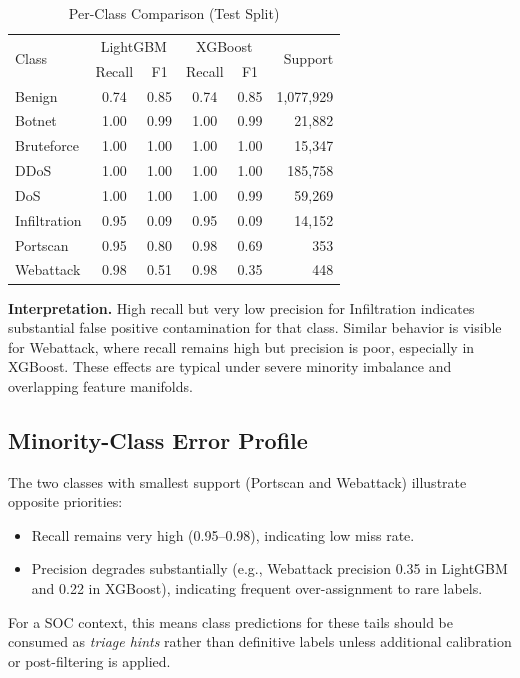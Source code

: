 \documentclass[10pt,journal]{IEEEtran}
\begin{document}
\begin{table}[!t]
\caption{Per-Class Comparison (Test Split)}
\label{tab:per_class}
\centering
\begin{tabular}{l c c c c r}
\toprule
\multirow{2}{*}{Class} & \multicolumn{2}{c}{LightGBM} & \multicolumn{2}{c}{XGBoost} & \multirow{2}{*}{Support} \\
 & Recall & F1 & Recall & F1 & \\
\midrule
Benign & 0.74 & 0.85 & 0.74 & 0.85 & 1,077,929 \\
Botnet & 1.00 & 0.99 & 1.00 & 0.99 & 21,882 \\
Bruteforce & 1.00 & 1.00 & 1.00 & 1.00 & 15,347 \\
DDoS & 1.00 & 1.00 & 1.00 & 1.00 & 185,758 \\
DoS & 1.00 & 1.00 & 1.00 & 0.99 & 59,269 \\
Infiltration & 0.95 & 0.09 & 0.95 & 0.09 & 14,152 \\
Portscan & 0.95 & 0.80 & 0.98 & 0.69 & 353 \\
Webattack & 0.98 & 0.51 & 0.98 & 0.35 & 448 \\
\bottomrule
\end{tabular}
\end{table}

\textbf{Interpretation.} High recall but very low precision for Infiltration indicates substantial false positive contamination for that class. Similar behavior is visible for Webattack, where recall remains high but precision is poor, especially in XGBoost. These effects are typical under severe minority imbalance and overlapping feature manifolds.

\subsection{Minority-Class Error Profile}
The two classes with smallest support (Portscan and Webattack) illustrate opposite priorities:
\begin{itemize}
\item Recall remains very high (0.95--0.98), indicating low miss rate.
\item Precision degrades substantially (e.g., Webattack precision 0.35 in LightGBM and 0.22 in XGBoost), indicating frequent over-assignment to rare labels.
\end{itemize}

For a SOC context, this means class predictions for these tails should be consumed as \emph{triage hints} rather than definitive labels unless additional calibration or post-filtering is applied.
\end{document}
